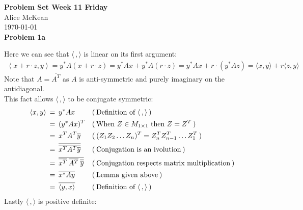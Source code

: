 \documentclass[fleqn]{article}
\newcommand{\problem}[1]{\large\textbf{Problem #1}\normalsize}
\newcommand{\evidence}[1]{\ensuremath{(\hspace{0.2em} \text{#1} \hspace{0.2em})}}
\newcommand{\relation}[1]{\ensuremath{\hspace{0.2em} {{} #1 {}} \hspace{0.2em}}}
\newcommand{\equal}{\relation{=}}
\begin{document}
\noindent\Large\textbf{Problem Set Week 11 Friday} \\
\normalsize
Alice McKean \\
\today \\

\problem{1a}

Here we can see that $\langle \, , \rangle$ is linear on its first argument:
\begin{align*}
  \left \langle x + r \cdot z, y \right \rangle
  = y^* A (x + r \cdot z)
  = y^* A x + y^* A (r \cdot z)
  = y^* A x + r \cdot (y^* A z)
  = \langle x, y \rangle + r \langle z, y \rangle
\end{align*}
Note that $A = \overline{A^T}$ as $A$ is anti-symmetric and purely imaginary on
the antidiagonal. \\
This fact allows $\langle \, , \rangle$ to be conjugate symmetric:
\begin{align*}
  \langle x, y \rangle
  &\equal y^* A x
  &&\evidence{Definition of $\langle \, , \rangle$} \\
  &\equal (y^* A x)^T
  &&\evidence{When $Z \in M_{1\times 1}$ then $Z = Z^T$} \\
  &\equal x^T A^T \overline{y}
  &&\evidence{$(Z_1Z_2\dots Z_n)^T = Z_n^TZ_{n-1}^T\dots Z_1^T$} \\
  &\equal \overline{\overline{x^T A^T \overline{y}}}
  &&\evidence{Conjugation is an ivolution} \\
  &\equal \overline{\overline{x^T} \: \overline{A^T} \: \overline{\overline{y}}} 
  &&\evidence{Conjugation respects matrix multiplication} \\
  &\equal \overline{x^* A y}
  &&\evidence{Lemma given above} \\
  &\equal \overline{\langle y, x \rangle}
  &&\evidence{Definition of $\langle \, , \rangle$}
\end{align*}
Lastly $\langle \, , \rangle$ is positive definite:
\end{document}
